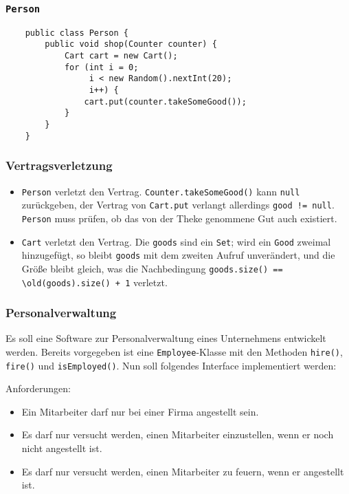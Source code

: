 \documentclass{beamer}
\begin{document}
\begin{frame}[fragile]
  \frametitle{\lstinline{Person}}
  \begin{lstlisting}
    public class Person {
        public void shop(Counter counter) {
            Cart cart = new Cart();
            for (int i = 0;
                 i < new Random().nextInt(20);
                 i++) {
                cart.put(counter.takeSomeGood());
            }
        }
    }
  \end{lstlisting}
\end{frame}

\begin{frame}[fragile]
  \frametitle{Vertragsverletzung}
  \begin{itemize}
  \item
    \lstinline{Person} verletzt den Vertrag.
    \lstinline{Counter.takeSomeGood()} kann \lstinline{null} zurückgeben,
    der Vertrag von \lstinline{Cart.put} verlangt allerdings \lstinline{good != null}.
    \lstinline{Person} muss prüfen, ob das von der Theke genommene Gut auch existiert.
    \pause
  \item
    \lstinline{Cart} verletzt den Vertrag.
    Die \lstinline{goods} sind ein \lstinline{Set};
    wird ein \lstinline{Good} zweimal hinzugefügt,
    so bleibt \lstinline{goods} mit dem zweiten Aufruf unverändert,
    und die Größe bleibt gleich,
    was die Nachbedingung \lstinline{goods.size() == \old(goods).size() + 1} verletzt.
  \end{itemize}
\end{frame}

\begin{frame}
  \frametitle{Personalverwaltung}
  Es soll eine Software zur Personalverwaltung eines Unternehmens entwickelt werden.
  Bereits vorgegeben ist eine \lstinline{Employee}-Klasse
  mit den Methoden \lstinline{hire()}, \lstinline{fire()} und \lstinline{isEmployed()}.
  Nun soll folgendes Interface implementiert werden:
  
  Anforderungen:
  \begin{itemize}
  \item
    Ein Mitarbeiter darf nur bei einer Firma angestellt sein.
  \item
    Es darf nur versucht werden, einen Mitarbeiter einzustellen, wenn er noch nicht angestellt ist.
  \item
    Es darf nur versucht werden, einen Mitarbeiter zu feuern, wenn er angestellt ist.
  \end{itemize}
\end{frame}
\end{document}
